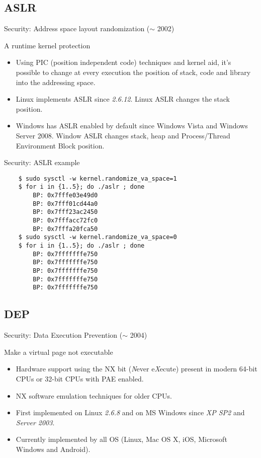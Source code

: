 \subsection{ASLR}
\begin{frame}[fragile]{Security: Address space layout randomization ($\sim$ 2002)}
	\begin{block}{A runtime kernel protection}
		\begin{itemize}
			\item Using PIC (position independent code) techniques and kernel aid,
				it's possible to change at every execution the position of stack, code
				and library into the addressing space.
			\item Linux implements ASLR since \emph{2.6.12}. Linux ASLR changes the
				stack position.
			\item Windows has ASLR enabled by default since Windows Vista and Windows
				Server 2008. Window ASLR changes stack, heap and Process/Thread
				Environment Block position.
		\end{itemize}
	\end{block}
\end{frame}

\begin{frame}[fragile]{Security: ASLR example}
	\begin{lstlisting}
	$ sudo sysctl -w kernel.randomize_va_space=1
	$ for i in {1..5}; do ./aslr ; done
		BP: 0x7fffe03e49d0
		BP: 0x7fff01cd44a0
		BP: 0x7fff23ac2450
		BP: 0x7fffacc72fc0
		BP: 0x7fffa20fca50
	$ sudo sysctl -w kernel.randomize_va_space=0
	$ for i in {1..5}; do ./aslr ; done
		BP: 0x7fffffffe750
		BP: 0x7fffffffe750
		BP: 0x7fffffffe750
		BP: 0x7fffffffe750
		BP: 0x7fffffffe750
	\end{lstlisting}
\end{frame}

\subsection{DEP}
\begin{frame}{Security: Data Execution Prevention ($\sim$ 2004)}
	\begin{block}{Make a virtual page not executable}
		\begin{itemize}
			\item Hardware support using the NX bit (\emph{N}ever e\emph{X}ecute)
				present in modern 64-bit CPUs or 32-bit CPUs with PAE enabled.
			\item NX software emulation techniques for older CPUs.
			\item First implemented on Linux \emph{2.6.8} and on MS Windows since
				\emph{XP SP2} and \emph{Server 2003}.
			\item Currently implemented by all OS (Linux, Mac OS X, iOS, Microsoft Windows and Android).
		\end{itemize}
	\end{block}
\end{frame}

